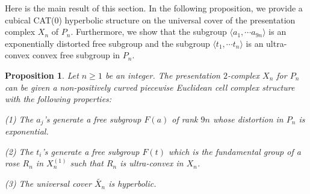 \documentclass[oneside,11pt,reqno]{amsart}
\newtheorem{prop}[thm]{Proposition}
\theoremstyle{definition}
\begin{document}
 



Here is the main result of this section. In the following proposition, we provide a cubical CAT($0$) hyperbolic structure on the universal cover of the presentation complex $X_n$ of $P_n$. Furthermore, we show that the subgroup $\langle a_1, \cdots a_{9n} \rangle$ is an exponentially distorted free subgroup and the subgroup $\langle t_1, \cdots t_{n} \rangle$ is an ultra-convex convex free subgroup in  $P_n$.




\begin{prop}\label{prop:block1}
Let $n \geq 1$ be an integer. The presentation $2$-complex $X_n$ for $P_n$ can be given a non-positively curved piecewise Euclidean cell complex structure with the following properties:

(1) The $a_j$'s generate a free subgroup $F(a)$ of rank $9n$ whose distortion in $P_n$ is exponential.

(2) The $t_i$'s generate a free subgroup $F(t)$ which is the fundamental group of a rose $R_n$ in $X_n^{(1)}$ such that $R_n$ is ultra-convex in 
$X_n$. 

(3) The universal cover $\widetilde{X_n}$ is hyperbolic.

\end{prop}
\end{document}
